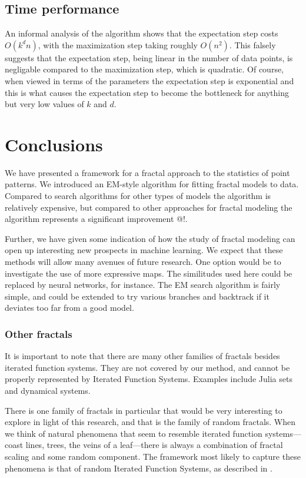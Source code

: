 \documentclass[10pt,a4paper,oneside]{article}
\theoremstyle{definition}
\begin{document}
\subsection{Time performance}

An informal analysis of the algorithm shows that the expectation step costs $O(k^dn)$, with the maximization step taking roughly $O(n^2)$. This falsely suggests that the expectation step, being linear in the number of data points, is negligable compared to the maximization step, which is quadratic. Of course, when viewed in terms of the parameters the expectation step is exponential and this is what causes the expectation step to become the bottleneck for anything but very low values of $k$ and $d$. 

\section*{Conclusions}

We have presented a framework for a fractal approach to the statistics of point patterns. We introduced an EM-style algorithm for fitting fractal models to data. Compared to search algorithms for other types of models the algorithm is relatively expensive, but compared to other approaches for fractal modeling the algorithm represents a significant improvement @!. 

Further, we have given some indication of how the study of fractal modeling can open up interesting new prospects in machine learning. We expect that these methods will allow many avenues of future research. One option would be to investigate the use of more expressive maps. The similitudes used here could be replaced by neural networks, for instance. The EM search algorithm is fairly simple, and could be extended to try various branches and backtrack if it deviates too far from a good model.

\subsubsection*{Other fractals}

It is important to note that there are many other families of fractals besides iterated function systems. They are not covered by our method, and cannot be properly represented by Iterated Function Systems. Examples include Julia sets and dynamical systems.

There is one family of fractals in particular that would be very interesting to explore in light of this research, and that is the family of random fractals. When we think of natural phenomena that seem to resemble iterated function systems---coast lines, trees, the veins of a leaf---there is always a combination of fractal scaling and some random component. The framework most likely to capture these phenomena is that of random Iterated Function Systems, as described in \cite{hutchinson2000deterministic}.
\end{document}
